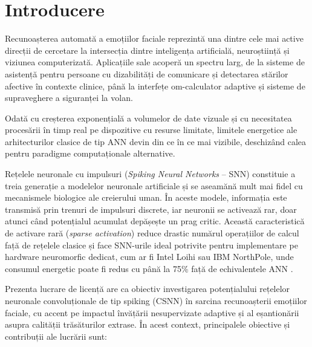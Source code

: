 \chapter*{Introducere}

Recunoașterea automată a emoțiilor faciale reprezintă una dintre cele mai active direcții de cercetare la intersecția dintre inteligența artificială, neuroștiință și viziunea computerizată. Aplicațiile sale acoperă un spectru larg, de la sisteme de asistență pentru persoane cu dizabilități de comunicare și detectarea stărilor afective în contexte clinice, până la interfețe om-calculator adaptive și sisteme de supraveghere a siguranței la volan.

Odată cu creșterea exponențială a volumelor de date vizuale și cu necesitatea procesării în timp real pe dispozitive cu resurse limitate, limitele energetice ale arhitecturilor clasice de tip ANN devin din ce în ce mai vizibile, deschizând calea pentru paradigme computaționale alternative.

Rețelele neuronale cu impulsuri (\textit{Spiking Neural Networks} – SNN) constituie a treia generație a modelelor neuronale artificiale și se aseamănă mult mai fidel cu mecanismele biologice ale creierului uman. În aceste modele, informația este transmisă prin trenuri de impulsuri discrete, iar neuronii se activează rar, doar atunci când potențialul acumulat depășește un prag critic. Această caracteristică de activare rară (\textit{sparse activation}) reduce drastic numărul operațiilor de calcul față de rețelele clasice și face SNN-urile ideal potrivite pentru implementare pe hardware neuromorfic dedicat, cum ar fi Intel Loihi sau IBM NorthPole, unde consumul energetic poate fi redus cu până la 75\% față de echivalentele ANN \cite{wang2022}.

Prezenta lucrare de licență are ca obiectiv investigarea potențialului rețelelor neuronale convoluționale de tip spiking (CSNN) în sarcina recunoașterii emoțiilor faciale, cu accent pe impactul învățării nesupervizate adaptive și al eșantionării asupra calității trăsăturilor extrase. În acest context, principalele obiective și contribuții ale lucrării sunt:

